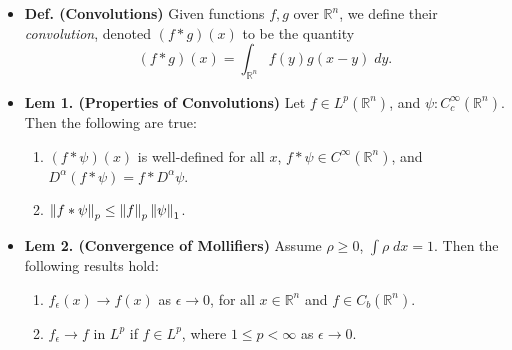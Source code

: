 \documentclass{article}
\begin{document}
\begin{itemize}
	\begin{solutions}
		Let $1 \leq p < \infty$, and fix $f \in L^{p}(\mathbb{R}^{n})$. We note that 
		\begin{equation}
			\int_{|x|\geq R}|f(x)|^{p}\;dx = \int_{\mathbb{R}^{n}}|f(x)|^{p}\chi_{\{|x| \geq R\}}\;dx. 
		\end{equation}
		Note that $|f(x)|^{p}\chi_{\{|x| \geq R\}} \leq |f(x)|^{p}$, $|f(x)|^{p}\chi_{\{|x| \geq R\}} \to 0$ pointwise, and $|f(x)|^{p} \in L^{1}$ (since $f\in L^{p}$). By the Dominated Convergence Theorem, we conclude that 
		\begin{equation}
			\int_{|x|\geq R}|f(x)|^{p}\;dx = \int_{\mathbb{R}^{n}}|f(x)|^{p}\chi_{\{|x| \geq R\}}\;dx \longrightarrow 0. 
		\end{equation} 
	\end{solutions} 
	
	\item \textbf{Def. (Convolutions)} Given functions $f, g$ over $\mathbb{R}^{n}$, we define their \textit{convolution}, denoted $(f \ast g)(x)$ to be the quantity 
	\begin{equation}
		(f \ast g)(x) = \int_{\mathbb{R}^{n}}f(y)g(x-y)\;dy.
	\end{equation}
	
	\item \textbf{Lem 1. (Properties of Convolutions)} Let $f \in L^{p}(\mathbb{R}^{n})$, and $\psi: C_{c}^{\infty}(\mathbb{R}^{n})$. Then the following are true: \vspace{-0.15cm}
	\begin{enumerate}[itemsep =-2pt,label = (\arabic{*})]
		\item $(f \ast \psi)(x)$ is well-defined for all $x$, $f \ast \psi \in C^{\infty}(\mathbb{R}^{n})$, and $D^{\alpha}(f \ast \psi) = f \ast D^{\alpha}\psi$. 
		\item $\left\Vert f \ast \psi \right\Vert_{p} \leq \left\Vert f \right\Vert_{p}\left\Vert \psi \right\Vert_{1}$. 
	\end{enumerate}
	\item \textbf{Lem 2. (Convergence of Mollifiers)} Assume $\rho \geq 0$, $\int \rho \;dx =  1$. Then the following results hold: \vspace{-0.25cm} 
	\begin{enumerate}[itemsep =-2pt,label = (\arabic{*})]
		\item $f_{\epsilon}(x) \to f(x)$ as $\epsilon \to 0$, for all $x \in \mathbb{R}^{n}$ and $f \in C_{b}(\mathbb{R}^{n})$. 
		\item $f_{\epsilon} \to f$ in $L^{p}$ if $f \in L^{p}$, where $1 \leq p < \infty$ as $\epsilon \to 0$. 
	\end{enumerate}
	

\end{itemize}
\end{document}
